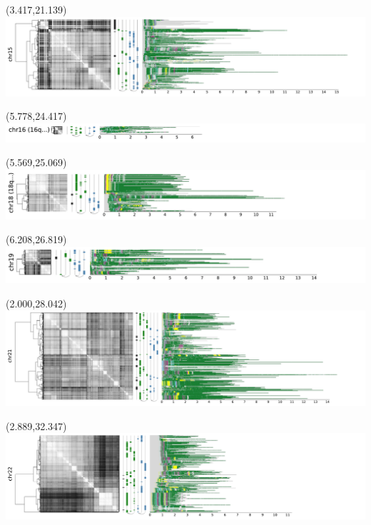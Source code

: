 \documentclass{article}
\begin{document}
\begin{textblock}{13}(3.417,21.139)\includegraphics{haplotypes/chr15.pdf}\end{textblock}
\begin{textblock}{13}(5.778,24.417)\includegraphics{haplotypes/16qtel_1-500K_1_12_12_rc.pdf}\end{textblock}
\begin{textblock}{13}(5.569,25.069)\includegraphics{haplotypes/18qtel_1-500K_1_12_12_rc.pdf}\end{textblock}
\begin{textblock}{13}(6.208,26.819)\includegraphics{haplotypes/chr19.pdf}\end{textblock}
\begin{textblock}{13}(2.000,28.042)\includegraphics{haplotypes/chr21.pdf}\end{textblock}
\begin{textblock}{13}(2.889,32.347)\includegraphics{haplotypes/chr22.pdf}\end{textblock}
\end{document}
